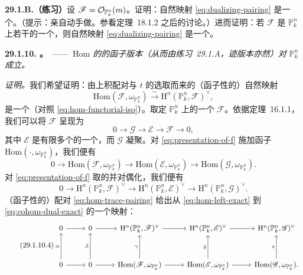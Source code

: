 \textbf{29.1.B.（练习）}\quad 设 $\mathscr{F}=\mathcal{O}_{\mathbb{P}^n_k}(m)$。证明：自然映射 \eqref{eq:dualizing-pairing} 是一个\trPerfectPairing。（提示：亲自动手做。参看\mbox{定理~18.1.2} 之后的讨论。）进而证明：若 $\mathscr{F}$ 是 $\mathbb{P}^n_k$ 上若干\trLineBundle{}的一个\trDirectSum，则自然映射 \eqref{eq:dualizing-pairing} 是一个\trPerfectPairing。

\textbf{29.1.10. \trhProposition。}\ ——\ \emph{$\mathrm{Hom}$ 的\trSerreDuality{}的函子版本（从而由\mbox{练习~29.1.A}，迹版本亦然）对 $\mathbb{P}^n_k$ 成立。}

\emph{证明。}\quad 我们希望证明：由上积配对与\trIsomorphism{} $t$ 的选取而来的（函子性的）自然映射
\[
\mathrm{Hom}(\mathscr{F},\omega_{\mathbb{P}^n_k})\overset{\sim}{\longrightarrow}\mathrm{H}^n(\mathbb{P}^n_k,\mathscr{F})^{\vee},
\]
是一个\trIsomorphism（对照 \eqref{eq:hom-functorial-iso}）。取定 $\mathbb{P}^n_k$ 上的一个\trCoherentSheaf{} $\mathscr{F}$。依据\mbox{定理~16.1.1}，我们可以将 $\mathscr{F}$ 呈现为
\begin{equation*}\tag{29.1.10.1}\label{eq:presentation-of-f}
0\longrightarrow\mathscr{G}\longrightarrow\mathscr{E}\longrightarrow\mathscr{F}\longrightarrow 0,
\end{equation*}
其中 $\mathscr{E}$ 是有限多个\trLineBundle{}的一个\trDirectSum，而 $\mathscr{G}$ 凝聚。对 \eqref{eq:presentation-of-f} 施加\trLeftExact{}函子 $\mathrm{Hom}(\cdot,\omega_{\mathbb{P}^n_k})$，我们便有\trExactSequence
\begin{equation*}\tag{29.1.10.2}\label{eq:hom-left-exact}
0\longrightarrow\mathrm{Hom}(\mathscr{F},\omega_{\mathbb{P}^n_k})\longrightarrow\mathrm{Hom}(\mathscr{E},\omega_{\mathbb{P}^n_k})\longrightarrow\mathrm{Hom}(\mathscr{G},\omega_{\mathbb{P}^n_k}).
\end{equation*}
对 \eqref{eq:presentation-of-f} 取\trCohomology{}的\trLongExactSequence{}并对偶化，我们便有\trExactSequence
\begin{equation*}\tag{29.1.10.3}\label{eq:cohom-dual-exact}
0\longrightarrow\mathrm{H}^n(\mathbb{P}^n_k,\mathscr{F})^{\vee}\longrightarrow\mathrm{H}^n(\mathbb{P}^n_k,\mathscr{E})^{\vee}\longrightarrow\mathrm{H}^n(\mathbb{P}^n_k,\mathscr{G})^{\vee}.
\end{equation*}
（函子性的）配对 \eqref{eq:hom-trace-pairing} 给出从 \eqref{eq:hom-left-exact} 到 \eqref{eq:cohom-dual-exact} 的一个映射：
\begin{equation*}\tag{29.1.10.4}\label{eq:five-lemma-map}
\begin{tikzcd}[row sep=3.2em, column sep=2.6em]
0 \ar[r] & 0 \ar[r] & \mathrm{H}^n(\mathbb{P}^n_k,\mathscr{F})^{\vee} \ar[r] & \mathrm{H}^n(\mathbb{P}^n_k,\mathscr{E})^{\vee} \ar[r] & \mathrm{H}^n(\mathbb{P}^n_k,\mathscr{G})^{\vee} \\
0 \ar[r] \ar[u, "\alpha"] & 0 \ar[r] \ar[u, "\beta"] & \mathrm{Hom}(\mathscr{F},\omega_{\mathbb{P}^n_k}) \ar[r] \ar[u, "\gamma"] & \mathrm{Hom}(\mathscr{E},\omega_{\mathbb{P}^n_k}) \ar[r] \ar[u, "\delta"] & \mathrm{Hom}(\mathscr{G},\omega_{\mathbb{P}^n_k}). \ar[u, "\epsilon"]
\end{tikzcd}
\end{equation*}
